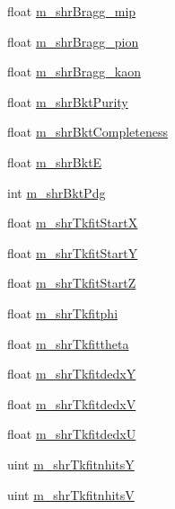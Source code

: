 \begin{DoxyCompactItemize}
\item 
float \hyperlink{classselection_1_1CCincSelection_a0d588b58345d52cc13a398bb3f6ff2fd}{m\-\_\-shr\-Bragg\-\_\-mip}
\item 
float \hyperlink{classselection_1_1CCincSelection_aeb3ad1e13e9e94fb9096d40f8c576a6a}{m\-\_\-shr\-Bragg\-\_\-pion}
\item 
float \hyperlink{classselection_1_1CCincSelection_a44d88e3b197705450db2becfae327827}{m\-\_\-shr\-Bragg\-\_\-kaon}
\item 
float \hyperlink{classselection_1_1CCincSelection_a95079e8ae0cb7d55594d64812d24327c}{m\-\_\-shr\-Bkt\-Purity}
\item 
float \hyperlink{classselection_1_1CCincSelection_ae50845633aef1725ac8c894101041f54}{m\-\_\-shr\-Bkt\-Completeness}
\item 
float \hyperlink{classselection_1_1CCincSelection_a0a43f7b976987cc6d13389a589c561e2}{m\-\_\-shr\-Bkt\-E}
\item 
int \hyperlink{classselection_1_1CCincSelection_aa11fee829a174ef4b6f92041edb990cf}{m\-\_\-shr\-Bkt\-Pdg}
\item 
float \hyperlink{classselection_1_1CCincSelection_a0bab1ed8cdf12861136bd47a6d48c7ad}{m\-\_\-shr\-Tkfit\-Start\-X}
\item 
float \hyperlink{classselection_1_1CCincSelection_aeff05af138a16a516e5413e21b6bcdf1}{m\-\_\-shr\-Tkfit\-Start\-Y}
\item 
float \hyperlink{classselection_1_1CCincSelection_a9c1c8138a2febe952478d15845ca8846}{m\-\_\-shr\-Tkfit\-Start\-Z}
\item 
float \hyperlink{classselection_1_1CCincSelection_af760bcbc586c53183f9ed2d5359b028a}{m\-\_\-shr\-Tkfitphi}
\item 
float \hyperlink{classselection_1_1CCincSelection_a9fa1d825a900a4081323091daa9b0aa7}{m\-\_\-shr\-Tkfittheta}
\item 
float \hyperlink{classselection_1_1CCincSelection_aa619cb73a3bb42251eaf5b35445e788b}{m\-\_\-shr\-Tkfitdedx\-Y}
\item 
float \hyperlink{classselection_1_1CCincSelection_afd1502883efc2504917a3b17eeb4aa46}{m\-\_\-shr\-Tkfitdedx\-V}
\item 
float \hyperlink{classselection_1_1CCincSelection_aaa3a14c43d0e840fa3032a46bd498db1}{m\-\_\-shr\-Tkfitdedx\-U}
\item 
uint \hyperlink{classselection_1_1CCincSelection_a63f55e51e3df0e108aace93b3c34c153}{m\-\_\-shr\-Tkfitnhits\-Y}
\item 
uint \hyperlink{classselection_1_1CCincSelection_a8ad70697906b08285a218c739e8c4815}{m\-\_\-shr\-Tkfitnhits\-V}

\end{DoxyCompactItemize}

